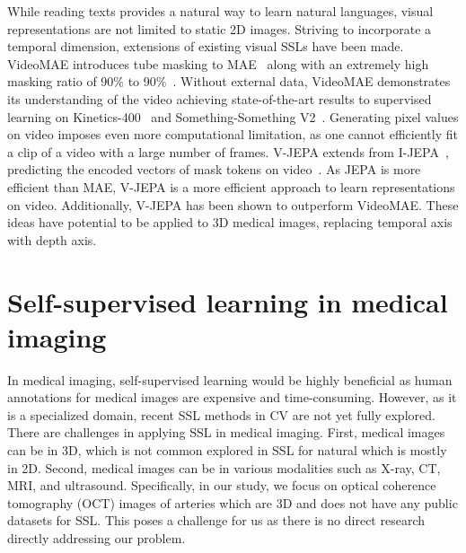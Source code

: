 \documentclass[a4paper,11pt,oneside]{report}
\begin{document}
While reading texts provides a natural way to learn natural languages, visual representations are not limited to static 2D images. Striving to incorporate a temporal dimension, extensions of existing visual SSLs have been made. VideoMAE introduces tube masking to MAE~\cite{He2022} along with an extremely high masking ratio of 90\% to 90\%~\cite{Tong2022VideoMAE}. Without external data, VideoMAE demonstrates its understanding of the video achieving state-of-the-art results to supervised learning on Kinetics-400~\cite{Kay2017Kinetics} and Something-Something V2~\cite{Goyal2017Something-SomethingV2}. Generating pixel values on video imposes even more computational limitation, as one cannot efficiently fit a clip of a video with a large number of frames. V-JEPA extends from I-JEPA~\cite{Assran2023}, predicting the encoded vectors of mask tokens on video~\cite{Bardes2024Vjepa}. As JEPA is more efficient than MAE, V-JEPA is a more efficient approach to learn representations on video. Additionally, V-JEPA has been shown to outperform VideoMAE. These ideas have potential to be applied to 3D medical images, replacing temporal axis with depth axis.

\section{Self-supervised learning in medical imaging}
In medical imaging, self-supervised learning would be highly beneficial as human annotations for medical images are expensive and time-consuming. However, as it is a specialized domain, recent SSL methods in CV are not yet fully explored. There are challenges in applying SSL in medical imaging. First, medical images can be in 3D, which is not common explored in SSL for natural which is mostly in 2D. Second, medical images can be in various modalities such as X-ray, CT, MRI, and ultrasound. Specifically, in our study, we focus on optical coherence tomography (OCT) images of arteries which are 3D and does not have any public datasets for SSL. This poses a challenge for us as there is no direct research directly addressing our problem.
\end{document}
